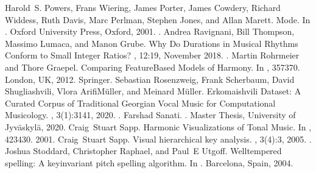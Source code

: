 \documentclass[letterpaper,10pt,english]{sphinxmanual}
\begin{document}
\begin{sphinxthebibliography}{10}
\sphinxAtStartPar
Harold S. Powers, Frans Wiering, James Porter, James Cowdery, Richard Widdess, Ruth Davis, Marc Perlman, Stephen Jones, and Allan Marett. Mode. In . Oxford University Press, Oxford, 2001. .
\sphinxAtStartPar
Andrea Ravignani, Bill Thompson, Massimo Lumaca, and Manon Grube. Why Do Durations in Musical Rhythms Conform to Small Integer Ratios? , 12:1\textendash{}9, November 2018. .
\sphinxAtStartPar
Martin Rohrmeier and Thore Graepel. Comparing Feature\sphinxhyphen{}Based Models of Harmony. In , 357\textendash{}370. London, UK, 2012. Springer.
\sphinxAtStartPar
Sebastian Rosenzweig, Frank Scherbaum, David Shugliashvili, Vlora Arifi\sphinxhyphen{}Müller, and Meinard Müller. Erkomaishvili Dataset: A Curated Corpus of Traditional Georgian Vocal Music for Computational Musicology. , 3(1):31\textendash{}41, 2020. .
\sphinxAtStartPar
Farshad Sanati. . Master Thesis, University of Jyväskylä, 2020.
\sphinxAtStartPar
Craig Stuart Sapp. Harmonic Visualizations of Tonal Music. In , 423\textendash{}430. 2001.
\sphinxAtStartPar
Craig Stuart Sapp. Visual hierarchical key analysis. , 3(4):3, 2005. .
\sphinxAtStartPar
Joshua Stoddard, Christopher Raphael, and Paul E Utgoff. Well\sphinxhyphen{}tempered spelling: A key\sphinxhyphen{}invariant pitch spelling algorithm. In . Barcelona, Spain, 2004.
\sphinxAtStartPar

\end{sphinxthebibliography}
\end{document}
